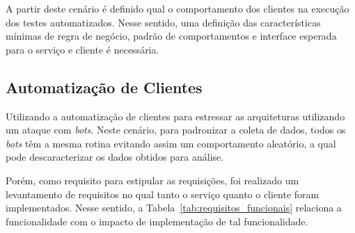 A partir deste cenário é definido qual o comportamento dos clientes na execução dos testes automatizados.
%
Nesse sentido, uma definição das características mínimas de regra de negócio, padrão de comportamentos e interface esperada para o serviço e cliente é necessária.



\subsection{Automatização de Clientes}
\label{sec:SimulaCliente}



Utilizando a automatização de clientes para estressar as arquiteturas utilizando um ataque com \textit{bots}.
%
Neste cenário, para padronizar a coleta de dados, todos os \textit{bots} têm a mesma rotina evitando assim um comportamento aleatório, a qual pode descaracterizar os dados obtidos para análise.



Porém, como requisito para estipular as requisições, foi realizado um levantamento de requisitos no qual tanto o serviço quanto o cliente foram implementados.
%
Nesse sentido, a Tabela~\ref{tab:requisitos_funcionais} relaciona a funcionalidade com o impacto de implementação de tal funcionalidade.



